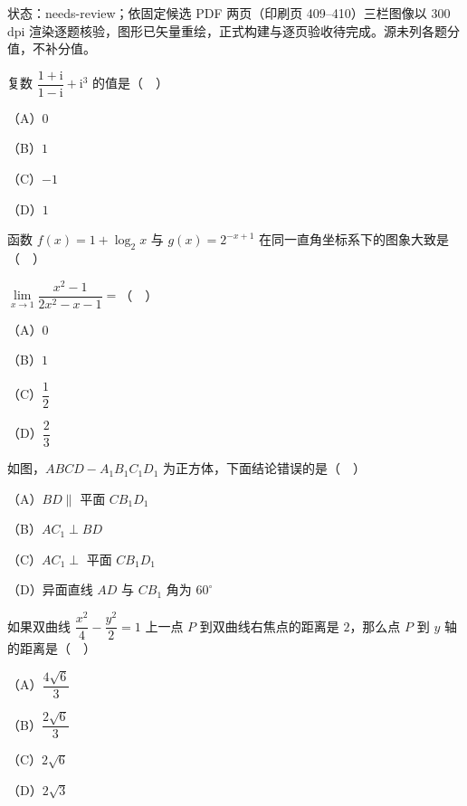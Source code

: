 

状态：needs-review；依固定候选 PDF 两页（印刷页 409–410）三栏图像以 300 dpi 渲染逐题核验，图形已矢量重绘，正式构建与逐页验收待完成。源未列各题分值，不补分值。


\begin{question}
复数 $\dfrac{1+\mathrm{i}}{1-\mathrm{i}}+\mathrm{i}^3$ 的值是（　）

（A）$0$

（B）$1$

（C）$-1$

（D）$1$

\Needspace{0.4\textheight}
\end{question}
\begin{question}
函数 $f(x)=1+\log_2 x$ 与 $g(x)=2^{-x+1}$ 在同一直角坐标系下的图象大致是（　）
\nopagebreak[4]
\begin{center}\end{center}
\nopagebreak[4]
\end{question}
\begin{question}
$\lim\limits_{x\to1}\dfrac{x^2-1}{2x^2-x-1}=$（　）

（A）$0$

（B）$1$

（C）$\dfrac12$

（D）$\dfrac23$

\Needspace{0.4\textheight}
\end{question}
\begin{question}
如图，$ABCD-A_1B_1C_1D_1$ 为正方体，下面结论错误的是（　）
\nopagebreak[4]
\begin{center}\end{center}
\nopagebreak[4]
（A）$BD\parallel$ 平面 $CB_1D_1$

（B）$AC_1\perp BD$

（C）$AC_1\perp$ 平面 $CB_1D_1$

（D）异面直线 $AD$ 与 $CB_1$ 角为 $60^\circ$

\end{question}
\begin{question}
如果双曲线 $\dfrac{x^2}{4}-\dfrac{y^2}{2}=1$ 上一点 $P$ 到双曲线右焦点的距离是 $2$，那么点 $P$ 到 $y$ 轴的距离是（　）

（A）$\dfrac{4\sqrt6}{3}$

（B）$\dfrac{2\sqrt6}{3}$

（C）$2\sqrt6$

（D）$2\sqrt3$

\Needspace{0.4\textheight}
\end{question}
